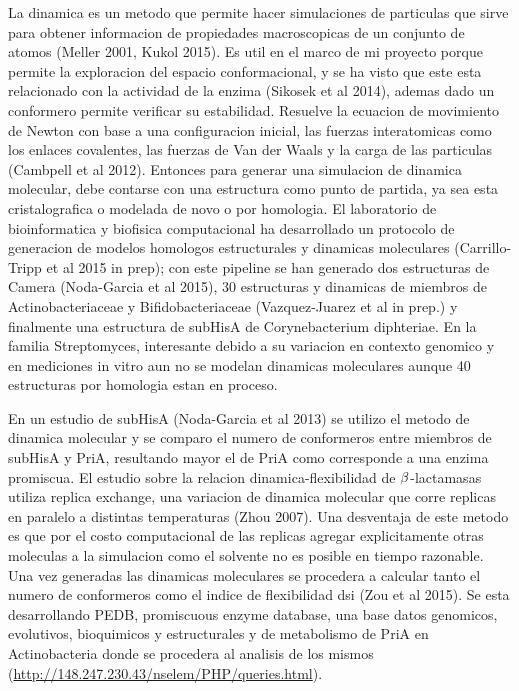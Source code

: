 \documentclass[12pt,twoside]{reedthesis}
\begin{document}
  La dinamica es un metodo que permite hacer simulaciones de particulas
  que sirve para obtener informacion de propiedades macroscopicas de un
  conjunto de atomos (Meller 2001, Kukol 2015). Es util en el marco de mi
  proyecto porque permite la exploracion del espacio conformacional, y se
  ha visto que este esta relacionado con la actividad de la enzima
  (Sikosek et al 2014), ademas dado un conformero permite verificar su
  estabilidad. Resuelve la ecuacion de movimiento de Newton con base a una
  configuracion inicial, las fuerzas interatomicas como los enlaces
  covalentes, las fuerzas de Van der Waals y la carga de las particulas
  (Cambpell et al 2012). Entonces para generar una simulacion de dinamica
  molecular, debe contarse con una estructura como punto de partida, ya
  sea esta cristalografica o modelada de novo o por homologia. El
  laboratorio de bioinformatica y biofisica computacional ha desarrollado
  un protocolo de generacion de modelos homologos estructurales y
  dinamicas moleculares (Carrillo-Tripp et al 2015 in prep); con este
  pipeline se han generado dos estructuras de Camera (Noda-Garcia et al
  2015), 30 estructuras y dinamicas de miembros de Actinobacteriaceae y
  Bifidobacteriaceae (Vazquez-Juarez et al in prep.) y finalmente una
  estructura de subHisA de Corynebacterium diphteriae. En la familia
  Streptomyces, interesante debido a su variacion en contexto genomico y
  en mediciones in vitro aun no se modelan dinamicas moleculares aunque 40
  estructuras por homologia estan en proceso.
  
  En un estudio de subHisA (Noda-Garcia et al 2013) se utilizo el metodo
  de dinamica molecular y se comparo el numero de conformeros entre
  miembros de subHisA y PriA, resultando mayor el de PriA como corresponde
  a una enzima promiscua. El estudio sobre la relacion
  dinamica-flexibilidad de \(\noindent\beta\)-lactamasas utiliza replica
  exchange, una variacion de dinamica molecular que corre replicas en
  paralelo a distintas temperaturas (Zhou 2007). Una desventaja de este
  metodo es que por el costo computacional de las replicas agregar
  explicitamente otras moleculas a la simulacion como el solvente no es
  posible en tiempo razonable. Una vez generadas las dinamicas moleculares
  se procedera a calcular tanto el numero de conformeros como el indice de
  flexibilidad dsi (Zou et al 2015). Se esta desarrollando PEDB,
  promiscuous enzyme database, una base datos genomicos, evolutivos,
  bioquimicos y estructurales y de metabolismo de PriA en Actinobacteria
  donde se procedera al analisis de los mismos
  (\url{http://148.247.230.43/nselem/PHP/queries.html}).
  
\end{document}
